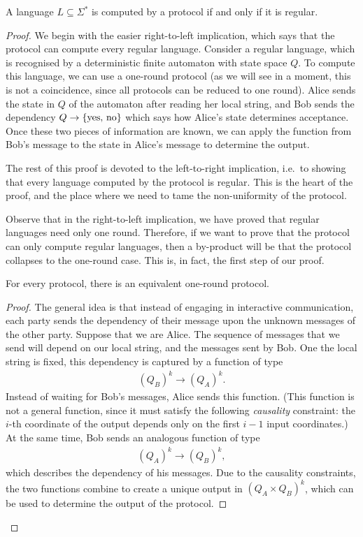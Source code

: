 \begin{theorem}
  \label{thm:boolean-domain}
  A language $L \subseteq \Sigma^*$ is computed by a protocol if and only if it is regular.
\end{theorem}
\begin{proof}
  We begin with the easier right-to-left implication, which says that the protocol can compute every regular language. Consider a regular language, which is recognised by a deterministic finite automaton with state space $Q$. To compute this language, we can use a  one-round protocol (as we will see in a moment, this is not a coincidence, since all protocols can be reduced to one round). Alice sends the state in $Q$ of the automaton after reading her local string, and Bob sends the dependency $Q \to \{\text{yes, no}\}$ which says how Alice's state determines acceptance. Once these two pieces of information are known, we can apply the function from Bob's message to the state in Alice's message to determine the output.

  The rest of this proof is devoted to the left-to-right implication, i.e.~to showing that every language computed by the protocol is regular. This is the heart of the proof, and the place where we need to tame the non-uniformity of the protocol. 
  
  Observe that in the right-to-left implication, we have proved that regular languages need only one round. Therefore, if we want to  prove that the protocol can only compute regular languages, then a by-product will be that the protocol collapses to the one-round case.  This is, in fact, the first step of our proof. 
  \begin{lemma}\label{lem:one-round-reduction-boolean}
    For every protocol, there is an equivalent one-round protocol. 
  \end{lemma}
  \begin{proof}
    The general idea is that instead of engaging in interactive communication, each party sends the dependency of their message upon the unknown messages of the other party. Suppose that we are  Alice. The sequence of messages that we send will depend on our local string, and  the messages sent by Bob. One the local string is fixed, this dependency is captured by a function of type 
    \begin{align*}
    (Q_B)^k \to (Q_A)^k.
    \end{align*}
    Instead of waiting for Bob's messages, Alice sends this function. (This function is not a general function, since it must satisfy the following \emph{causality} constraint: the $i$-th coordinate of the output depends only on the first $i-1$ input coordinates.) At the same time, Bob sends an analogous function of type 
    \begin{align*}
    (Q_A)^k \to (Q_B)^k,
    \end{align*}
    which describes the dependency of his messages. Due to the causality constraints, the two functions combine to create a unique output in $(Q_A \times Q_B)^k$, which can be used to determine the output of the protocol.
  \end{proof}


\end{proof}
